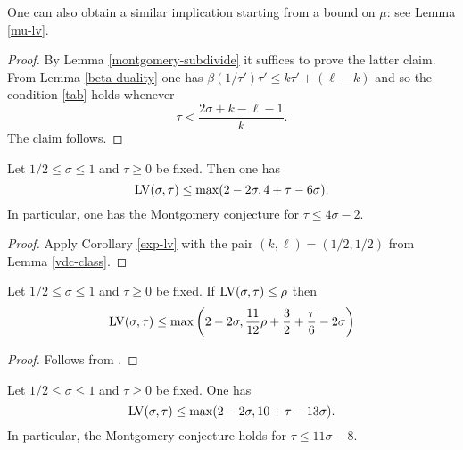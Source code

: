 One can also obtain a similar implication starting from a bound on $\mu$: see Lemma \ref{mu-lv}.

\begin{proof}  By Lemma \ref{montgomery-subdivide} it suffices to prove the latter claim.  From Lemma \ref{beta-duality} one has
    $\beta(1/\tau') \tau' \leq k \tau' + (\ell-k)$
and so the condition \eqref{tab} holds whenever
$$ \tau < \frac{2\sigma+k-\ell-1}{k}.$$
The claim follows.
\end{proof}

\begin{theorem}\label{huxley-lv}\cite[Equation~(2.9)]{Huxley} Let $1/2 \leq \sigma \leq 1$ and $\tau \geq 0$ be fixed.  Then one has
    $$ \mathrm{LV}(\sigma,\tau) \leq \max( 2-2\sigma, 4 + \tau - 6 \sigma).$$
    In particular, one has the Montgomery conjecture for $\tau \leq 4 \sigma - 2$.
\end{theorem}

\literature
{}

\begin{proof}  Apply Corollary \ref{exp-lv} with the pair $(k,\ell) = (1/2,1/2)$ from Lemma \ref{vdc-class}.
\end{proof}





\begin{theorem}\label{heath_brown-lv-prelim} Let $1/2 \leq \sigma \leq 1$ and $\tau \geq 0$ be fixed.  If $\mathrm{LV}(\sigma, \tau) \le \rho$ then
    \[
    \mathrm{LV}(\sigma, \tau) \le \max\left(2 - 2\sigma, \frac{11}{12}\rho + \frac{3}{2} + \frac{\tau}{6} - 2\sigma\right)
    \]
\end{theorem}

\begin{proof}
    Follows from \cite[Lemma~1]{heathbrown_zero_1979}.
\end{proof}

\begin{theorem}\label{hb-opt} Let $1/2 \leq \sigma \leq 1$ and $\tau \geq 0$ be fixed.   One has
    $$ \mathrm{LV}(\sigma,\tau) \leq \max( 2-2\sigma, 10 + \tau - 13 \sigma).$$
In particular, the Montgomery conjecture holds for $\tau \leq 11 \sigma - 8$.
\end{theorem}



